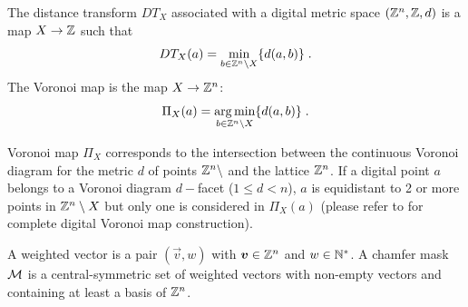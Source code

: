 \documentclass{llncs}
\begin{document}
\begin{definition}
  The distance transform $DT_X$ associated with a digital metric space
  $({\mathbb{Z}}^n,{\mathbb{Z}},d)$ is a map  $X\rightarrow{\mathbb{Z}}$ such that
  \begin{equation}
    DT_X(a) = \min_{b\in {\mathbb{Z}}^n\setminus X} \{d(a,b)\}\;.
  \end{equation}
The Voronoi map is the map $X\rightarrow{\mathbb{Z}}^n$:
  \begin{equation}
    \Pi_X(a) = \operatorname*{arg\,min}_{b\in {\mathbb{Z}}^n\setminus X} \{d(a,b)\}\;.
  \end{equation}
\end{definition}
Voronoi map $\Pi_X$ corresponds to the intersection between the
continuous Voronoi diagram for the metric $d$ of points
${\mathbb{Z}}^n\setminus$ and the lattice ${\mathbb{Z}}^n$. If a digital point $a$ belongs
to a Voronoi diagram $d-$facet ($1\leq d< n$), $a$ is equidistant to 2
or more points in ${\mathbb{Z}}^n\setminus X$ but only one is considered in
$\Pi_X(a)$ (please refer to\cite{Couprie2007} for complete digital
Voronoi map construction).

\begin{definition}
  A weighted vector is a pair $(\vec{v},w)$ with $\vec{v}\in\Z^n$ and
  $w\in{\mathbb{N}}^*$. A chamfer mask $\mathcal{M}$ is a central-symmetric set of weighted
  vectors with non-empty vectors and containing at least a basis of
  ${\mathbb{Z}}^n$.
\end{definition}
\end{document}
